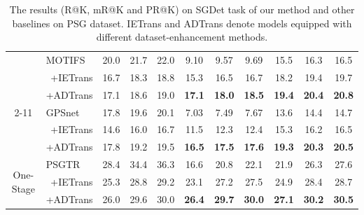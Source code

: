 \documentclass[letterpaper]{article} %
\begin{document}
\begin{table}[]
\begin{tabular}{cr|ccccccccc}
\multicolumn{1}{c|}{}                            & \multicolumn{1}{l|}{MOTIFS \cite{Zellers_2018_CVPR}}    & 20.0 & 21.7 & \multicolumn{1}{c|}{22.0}  & 9.10          & 9.57          & \multicolumn{1}{c|}{9.69}          & 15.5          & 16.3          & 16.5          \\
\multicolumn{1}{c|}{}                            & \quad +IETrans \cite{zhang2022fine}                      & 16.7 & 18.3 & \multicolumn{1}{c|}{18.8}  & 15.3          & 16.5          & \multicolumn{1}{c|}{16.7}          & 18.2          & 19.4          & 19.7          \\
\multicolumn{1}{c|}{}                            & \multicolumn{1}{l|}{\quad +ADTrans }                        & 17.1 & 18.6 & \multicolumn{1}{c|}{19.0}  & \textbf{17.1} & \textbf{18.0} & \multicolumn{1}{c|}{\textbf{18.5}} & \textbf{19.4} & \textbf{20.4} & \textbf{20.8} \\ \cline{2-11} 
\multicolumn{1}{c|}{}                            & \multicolumn{1}{l|}{GPSnet \cite{Lin_2020_CVPR}}    & 17.8 & 19.6 & \multicolumn{1}{c|}{20.1}  & 7.03          & 7.49          & \multicolumn{1}{c|}{7.67}          & 13.6          & 14.4          & 14.7          \\
\multicolumn{1}{c|}{}                            & \quad +IETrans \cite{zhang2022fine}                      & 14.6 & 16.0 & \multicolumn{1}{c|}{16.7}  & 11.5          & 12.3          & \multicolumn{1}{c|}{12.4}          & 15.3          & 16.2          & 16.5          \\
\multicolumn{1}{c|}{}                            & \multicolumn{1}{l|}{\quad +ADTrans }                        & 17.8 & 19.2 & \multicolumn{1}{c|}{19.5}  & \textbf{16.5} & \textbf{17.5} & \multicolumn{1}{c|}{\textbf{17.6}} & \textbf{19.3} & \textbf{20.3} & \textbf{20.5} \\ \hline
\multicolumn{1}{c|}{\multirow{3}{*}{One-Stage}}  
& \multicolumn{1}{l|}{PSGTR \cite{yang2022psg}}     & 28.4 & 34.4 & \multicolumn{1}{c|}{36.3}  & 16.6          & 20.8          & \multicolumn{1}{c|}{22.1}          & 21.9          & 26.3          & 27.6          \\
\multicolumn{1}{c|}{}                            & \quad +IETrans \cite{zhang2022fine}                      & 25.3 & 28.8 & \multicolumn{1}{c|}{29.2}  & 23.1          & 27.2          & \multicolumn{1}{c|}{27.5}          & 24.9          & 28.4          & 28.7          \\
\multicolumn{1}{c|}{}                            & \multicolumn{1}{l|}{\quad +ADTrans }                          & 26.0 & 29.6 & \multicolumn{1}{c|}{30.0}  & \textbf{26.4} & \textbf{29.7} & \multicolumn{1}{c|}{\textbf{30.0}} & \textbf{27.1} & \textbf{30.2} & \textbf{30.5} \\ \hline
\end{tabular}
\label{main}
\caption{The results (R@K, mR@K and PR@K) on SGDet task of our method and other baselines on PSG dataset. IETrans and ADTrans denote models equipped with different dataset-enhancement methods. } 
\end{table}
\end{document}
